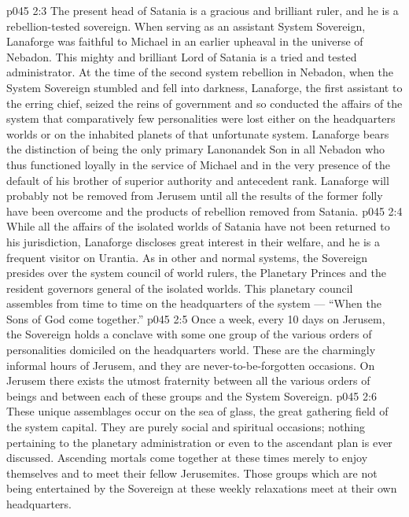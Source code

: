 \vs p045 2:3 \pc The present head of Satania is a gracious and brilliant ruler, and he is a rebellion\hyp{}tested sovereign. When serving as an assistant System Sovereign, Lanaforge was faithful to Michael in an earlier upheaval in the universe of Nebadon. This mighty and brilliant Lord of Satania is a tried and tested administrator. At the time of the second system rebellion in Nebadon, when the System Sovereign stumbled and fell into darkness, Lanaforge, the first assistant to the erring chief, seized the reins of government and so conducted the affairs of the system that comparatively few personalities were lost either on the headquarters worlds or on the inhabited planets of that unfortunate system. Lanaforge bears the distinction of being the only primary Lanonandek Son in all Nebadon who thus functioned loyally in the service of Michael and in the very presence of the default of his brother of superior authority and antecedent rank. Lanaforge will probably not be removed from Jerusem until all the results of the former folly have been overcome and the products of rebellion removed from Satania.
\vs p045 2:4 \pc While all the affairs of the isolated worlds of Satania have not been returned to his jurisdiction, Lanaforge discloses great interest in their welfare, and he is a frequent visitor on Urantia. As in other and normal systems, the Sovereign presides over the system council of world rulers, the Planetary Princes and the resident governors general of the isolated worlds. This planetary council assembles from time to time on the headquarters of the system --- “When the Sons of God come together.”
\vs p045 2:5 Once a week, every 10 days on Jerusem, the Sovereign holds a conclave with some one group of the various orders of personalities domiciled on the headquarters world. These are the charmingly informal hours of Jerusem, and they are never\hyp{}to\hyp{}be\hyp{}forgotten occasions. On Jerusem there exists the utmost fraternity between all the various orders of beings and between each of these groups and the System Sovereign.
\vs p045 2:6 These unique assemblages occur on the sea of glass, the great gathering field of the system capital. They are purely social and spiritual occasions; nothing pertaining to the planetary administration or even to the ascendant plan is ever discussed. Ascending mortals come together at these times merely to enjoy themselves and to meet their fellow Jerusemites. Those groups which are not being entertained by the Sovereign at these weekly relaxations meet at their own headquarters.
